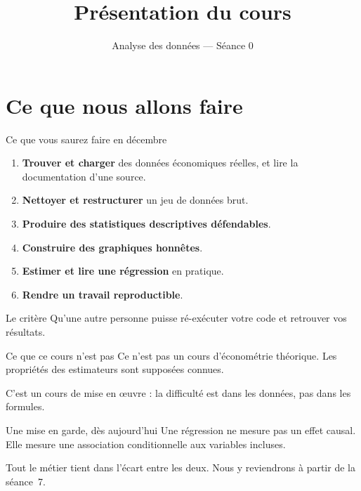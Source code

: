 \documentclass[10pt,aspectratio=169]{beamer}
\title{Présentation du cours}
\subtitle{Analyse des données --- Séance 0}
\begin{document}
\maketitle

\section{Ce que nous allons faire}

\begin{frame}{Ce que vous saurez faire en décembre}
\begin{enumerate}
  \item \textbf{Trouver et charger} des données économiques réelles, et lire la documentation d'une source.
  \item \textbf{Nettoyer et restructurer} un jeu de données brut.
  \item \textbf{Produire des statistiques descriptives défendables}.
  \item \textbf{Construire des graphiques honnêtes}.
  \item \textbf{Estimer et lire une régression} en pratique.
  \item \textbf{Rendre un travail reproductible}.
\end{enumerate}
\vfill
\begin{alertblock}{Le critère}
Qu'une autre personne puisse ré-exécuter votre code et retrouver vos résultats.
\end{alertblock}
\end{frame}

\begin{frame}{Ce que ce cours n'est pas}
Ce n'est pas un cours d'économétrie théorique. Les propriétés des estimateurs sont supposées connues.

\vspace{1em}
C'est un cours de \alert{mise en œuvre} : la difficulté est dans les données, pas dans les formules.

\vspace{1.5em}
\begin{block}{Une mise en garde, dès aujourd'hui}
Une régression ne mesure pas un effet causal. Elle mesure une association conditionnelle aux variables incluses.

\vspace{0.4em}
Tout le métier tient dans l'écart entre les deux. Nous y reviendrons à partir de la séance~7.
\end{block}
\end{frame}
\end{document}
